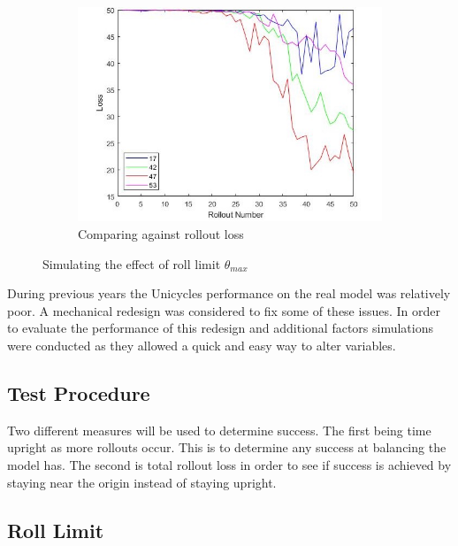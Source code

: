 \documentclass[twoside,twocolumn,12pt]{article}
\begin{document}
\begin{figure}[hb!]
\begin{subfigure}[t]{0.325\textwidth}
    \includegraphics[width=\linewidth]{average_angle_loss}
    \caption{Comparing against rollout loss}
  \label{fig:rl}
  \end{subfigure}
  \caption{Simulating the effect of roll limit $\theta_{max}$ }
  \label{fig:rolllimit}
\end{figure}

During previous years the Unicycles performance on the real model was relatively poor. A mechanical redesign was considered to fix some of these issues. In order to evaluate the performance of this redesign and additional factors simulations were conducted as they allowed a quick and easy way to alter variables.

\subsection{Test Procedure}

Two different measures will be used to determine success. The first being time upright as more rollouts occur. This is to determine any success at balancing the model has. The second is total rollout loss in order to see if success is achieved by staying near the origin instead of staying upright.
\subsection{Roll Limit}
\end{document}
